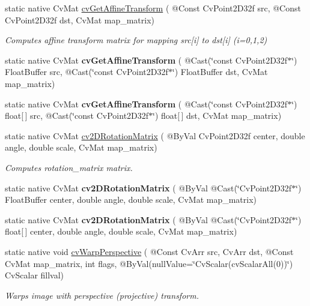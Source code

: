 \begin{DoxyCompactItemize}
\item 
static native Cv\+Mat \hyperlink{group__imgproc__c_ga6deb33dc741b5402e8660d553cf299c3}{cv\+Get\+Affine\+Transform} ( @Const Cv\+Point2\+D32f src, @Const Cv\+Point2\+D32f dst, Cv\+Mat map\+\_\+matrix)
\begin{DoxyCompactList}\small\item\em Computes affine transform matrix for mapping src\mbox{[}i\mbox{]} to dst\mbox{[}i\mbox{]} (i=0,1,2) \end{DoxyCompactList}\item 
static native Cv\+Mat {\bfseries cv\+Get\+Affine\+Transform} ( @Cast(\char`\"{}const Cv\+Point2\+D32f$\ast$\char`\"{}) Float\+Buffer src, @Cast(\char`\"{}const Cv\+Point2\+D32f$\ast$\char`\"{}) Float\+Buffer dst, Cv\+Mat map\+\_\+matrix)
\item 
static native Cv\+Mat {\bfseries cv\+Get\+Affine\+Transform} ( @Cast(\char`\"{}const Cv\+Point2\+D32f$\ast$\char`\"{}) float\mbox{[}$\,$\mbox{]} src, @Cast(\char`\"{}const Cv\+Point2\+D32f$\ast$\char`\"{}) float\mbox{[}$\,$\mbox{]} dst, Cv\+Mat map\+\_\+matrix)
\item 
static native Cv\+Mat \hyperlink{group__imgproc__c_ga8808b742ceec81dac792c107ef82fe13}{cv2\+D\+Rotation\+Matrix} ( @By\+Val Cv\+Point2\+D32f center, double angle, double scale, Cv\+Mat map\+\_\+matrix)
\begin{DoxyCompactList}\small\item\em Computes rotation\+\_\+matrix matrix. \end{DoxyCompactList}\item 
static native Cv\+Mat {\bfseries cv2\+D\+Rotation\+Matrix} ( @By\+Val @Cast(\char`\"{}Cv\+Point2\+D32f$\ast$\char`\"{}) Float\+Buffer center, double angle, double scale, Cv\+Mat map\+\_\+matrix)
\item 
static native Cv\+Mat {\bfseries cv2\+D\+Rotation\+Matrix} ( @By\+Val @Cast(\char`\"{}Cv\+Point2\+D32f$\ast$\char`\"{}) float\mbox{[}$\,$\mbox{]} center, double angle, double scale, Cv\+Mat map\+\_\+matrix)
\item 
static native void \hyperlink{group__imgproc__c_ga77d2f4184f964c0a75b65d576b0fd417}{cv\+Warp\+Perspective} ( @Const Cv\+Arr src, Cv\+Arr dst, @Const Cv\+Mat map\+\_\+matrix, int flags, @By\+Val(null\+Value=\char`\"{}Cv\+Scalar(cv\+Scalar\+All(0))\char`\"{}) Cv\+Scalar fillval)
\begin{DoxyCompactList}\small\item\em Warps image with perspective (projective) transform. \end{DoxyCompactList}\item 

\end{DoxyCompactItemize}
